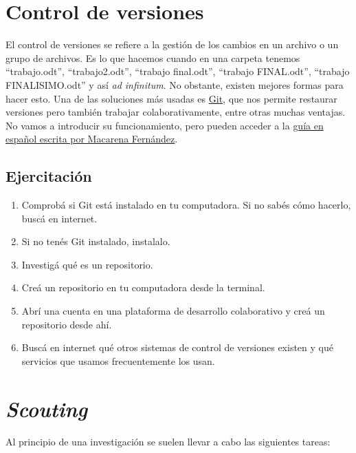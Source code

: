 \documentclass[12pt,spanish,a4paper,]{article}
\providecommand{\tightlist}{%
  \setlength{\itemsep}{0pt}\setlength{\parskip}{0pt}}
\begin{document}
\hypertarget{control-de-versiones}{%
\section{Control de versiones}\label{control-de-versiones}}

El control de versiones se refiere a la gestión de los cambios en un
archivo o un grupo de archivos. Es lo que hacemos cuando en una carpeta
tenemos ``trabajo.odt'', ``trabajo2.odt'', ``trabajo final.odt'',
``trabajo FINAL.odt'', ``trabajo FINALISIMO.odt'' y así \emph{ad
infinitum}. No obstante, existen mejores formas para hacer esto. Una de
las soluciones más usadas es \href{https://git-scm.com/}{Git}, que nos
permite restaurar versiones pero también trabajar colaborativamente,
entre otras muchas ventajas. No vamos a introducir su funcionamiento,
pero pueden acceder a la
\href{https://aladaspalabras.gitlab.io/hellogit/}{guía en español
escrita por Macarena Fernández}.

\hypertarget{ejercitacion-2}{%
\subsection{Ejercitación}\label{ejercitacion-2}}

\begin{enumerate}
\def\labelenumi{\arabic{enumi}.}
\tightlist
\item
  Comprobá si Git está instalado en tu computadora. Si no sabés cómo
  hacerlo, buscá en internet.
\item
  Si no tenés Git instalado, instalalo.
\item
  Investigá qué es un repositorio.
\item
  Creá un repositorio en tu computadora desde la terminal.
\item
  Abrí una cuenta en una plataforma de desarrollo colaborativo y creá un
  repositorio desde ahí.
\item
  Buscá en internet qué otros sistemas de control de versiones existen y
  qué servicios que usamos frecuentemente los usan.
\end{enumerate}

\hypertarget{scouting}{%
\section{\texorpdfstring{\emph{Scouting}}{Scouting}}\label{scouting}}

Al principio de una investigación se suelen llevar a cabo las siguientes
tareas:
\end{document}
